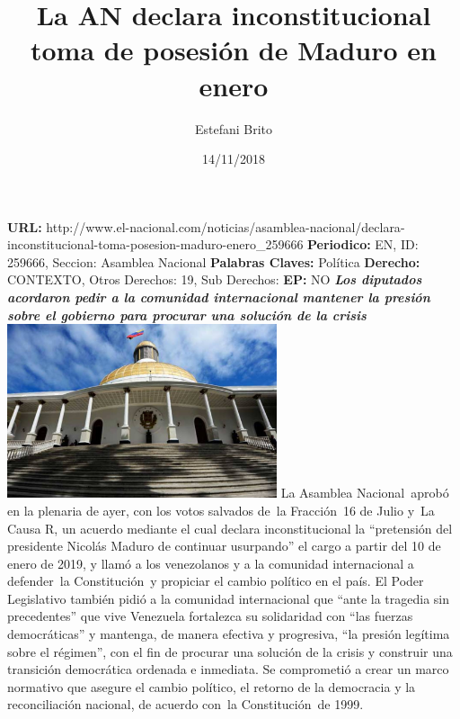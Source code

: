 \documentclass{article}%
\title{\textbf{La AN declara inconstitucional toma de posesión de Maduro en enero}}%
\author{Estefani Brito}%
\date{14/11/2018}%
\begin{document}
%
\normalsize%
\maketitle%
\textbf{URL: }%
http://www.el{-}nacional.com/noticias/asamblea{-}nacional/declara{-}inconstitucional{-}toma{-}posesion{-}maduro{-}enero\_259666\newline%
%
\textbf{Periodico: }%
EN, %
ID: %
259666, %
Seccion: %
Asamblea Nacional\newline%
%
\textbf{Palabras Claves: }%
Política\newline%
%
\textbf{Derecho: }%
CONTEXTO, %
Otros Derechos: %
19, %
Sub Derechos: %
\newline%
%
\textbf{EP: }%
NO\newline%
\newline%
%
\textbf{\textit{Los diputados acordaron pedir a la comunidad internacional mantener la presión sobre el gobierno para procurar una solución de la crisis}}%
\newline%
\newline%
%
\includegraphics[width=300px]{39.jpg}%
\newline%
%
La Asamblea Nacional~aprobó en la plenaria de ayer, con los votos salvados de~la Fracción~16 de Julio y~La Causa R, un acuerdo mediante el cual declara inconstitucional la “pretensión del presidente Nicolás Maduro de continuar usurpando” el cargo a partir del 10 de enero de 2019, y llamó a los venezolanos y a la comunidad internacional a defender~la Constitución~y propiciar el cambio político en el país.%
\newline%
%
El Poder Legislativo también pidió a la comunidad internacional que “ante la tragedia sin precedentes” que vive Venezuela fortalezca su solidaridad con “las fuerzas democráticas” y mantenga, de manera efectiva y progresiva, “la presión legítima sobre el régimen”, con el fin de procurar una solución de la crisis y construir una transición democrática ordenada e inmediata.%
\newline%
%
Se comprometió a crear un marco normativo que asegure el cambio político, el retorno de la democracia y la reconciliación nacional, de acuerdo con~la Constitución~de 1999.%
\end{document}
